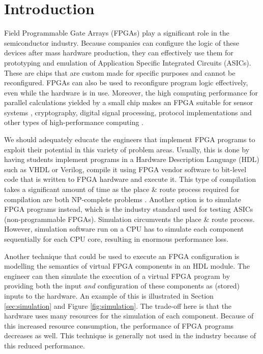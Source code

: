 \chapter{Introduction}
Field Programmable Gate Arrays (FPGAs) play a significant role in the semiconductor industry. Because companies can configure the logic of these devices after mass hardware production, they can effectively use them for prototyping and emulation of Application Specific Integrated Circuits (ASICs). These are chips that are custom made for specific purposes and cannot be reconfigured. FPGAs can also be used to reconfigure program logic effectively, even while the hardware is in use. Moreover, the high computing performance for parallel calculations yielded by a small chip makes an FPGA suitable for sensor systems \cite{Garcia20146247}, cryptography\cite{Yalla2009225, Nawari2015, Ikram2020172}, digital signal processing\cite{4566369}, protocol implementations\cite{Saha2014} and other types of high-performance computing \cite{Kanazawa2010}.

We should adequately educate the engineers that implement FPGA programs to exploit their potential in this variety of problem areas. Usually, this is done by having students implement programs in a Hardware Description Language (HDL) such as VHDL or Verilog, compile it using FPGA vendor software to bit-level code that is written to FPGA hardware and execute it. This type of compilation takes a significant amount of time as the place \& route process required for compilation are both NP-complete problems \cite{1585279}. Another option is to simulate FPGA programs instead, which is the industry standard used for testing ASICs (non-programmable FPGAs). Simulation circumvents the place \& route process. However, simulation software run on a CPU has to simulate each component sequentially for each CPU core, resulting in enormous performance loss. 

Another technique that could be used to execute an FPGA configuration is modelling the semantics of virtual FPGA components in an HDL module. The engineer can then simulate the execution of a virtual FPGA program by providing both the input \textit{and} configuration of these components as (stored) inputs to the hardware. An example of this is illustrated in Section \ref{sec:simulation} and Figure \ref{fig:simulation}. The trade-off here is that the hardware uses many resources for the simulation of each component. Because of this increased resource consumption, the performance of FPGA programs decreases as well. This technique is generally not used in the industry because of this reduced performance.

